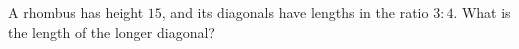 A rhombus has height $15$, and its diagonals have lengths in the ratio $3:4$. What is the length of the longer diagonal?
